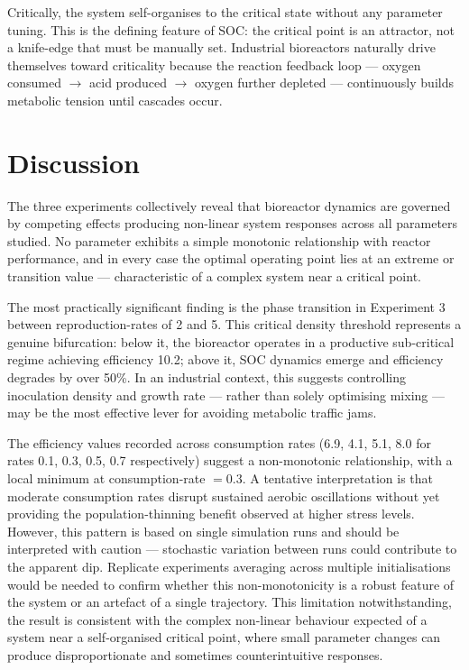 \documentclass[12pt]{article}
\begin{document}
Critically, the system self-organises to the critical state without any parameter tuning. This is the defining feature of SOC: the critical point is an attractor, not a knife-edge that must be manually set. Industrial bioreactors naturally drive themselves toward criticality because the reaction feedback loop --- oxygen consumed $\rightarrow$ acid produced $\rightarrow$ oxygen further depleted --- continuously builds metabolic tension until cascades occur.

\section{Discussion}

The three experiments collectively reveal that bioreactor dynamics are governed by competing effects producing non-linear system responses across all parameters studied. No parameter exhibits a simple monotonic relationship with reactor performance, and in every case the optimal operating point lies at an extreme or transition value --- characteristic of a complex system near a critical point.

The most practically significant finding is the phase transition in Experiment 3 between reproduction-rates of 2 and 5. This critical density threshold represents a genuine bifurcation: below it, the bioreactor operates in a productive sub-critical regime achieving efficiency 10.2; above it, SOC dynamics emerge and efficiency degrades by over 50\%. In an industrial context, this suggests controlling inoculation density and growth rate --- rather than solely optimising mixing --- may be the most effective lever for avoiding metabolic traffic jams.

The efficiency values recorded across consumption rates (6.9, 4.1, 5.1, 8.0
for rates 0.1, 0.3, 0.5, 0.7 respectively) suggest a non-monotonic
relationship, with a local minimum at consumption-rate $= 0.3$. A tentative
interpretation is that moderate consumption rates disrupt sustained aerobic
oscillations without yet providing the population-thinning benefit observed at
higher stress levels. However, this pattern is based on single simulation runs
and should be interpreted with caution --- stochastic variation between runs
could contribute to the apparent dip. Replicate experiments averaging across
multiple initialisations would be needed to confirm whether this non-monotonicity
is a robust feature of the system or an artefact of a single trajectory.
This limitation notwithstanding, the result is consistent with the
complex non-linear behaviour expected of a system near a self-organised
critical point, where small parameter changes can produce disproportionate
and sometimes counterintuitive responses.
\end{document}
